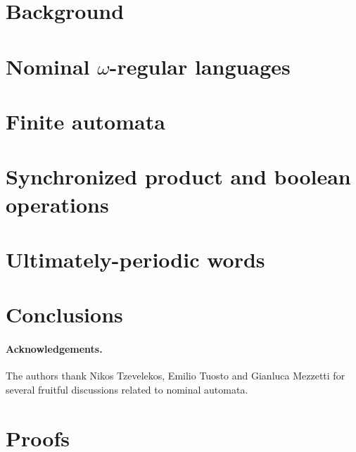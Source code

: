 \documentclass[orivec]{llncs}
\begin{document}
\section{Background}\label{sec:background}

\section{Nominal \texorpdfstring{$\omega$}{omega}-regular languages}\label{sec:languages}


\section{Finite automata}\label{sec:hd-automata}



\section{Synchronized product and boolean operations}\label{sec:sync-product}

%


\section{Ultimately-periodic words}\label{sec:up-words}

\section{Conclusions}\label{sec:conclusions}



\paragraph{Acknowledgements.} The authors thank Nikos Tzevelekos, Emilio Tuosto and Gianluca Mezzetti for several fruitful discussions related to nominal automata.



%

\appendix
\section{Proofs}

\end{document}

